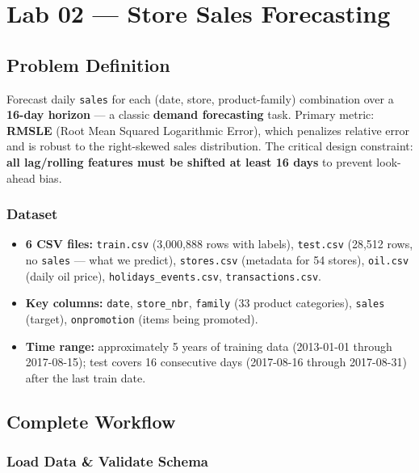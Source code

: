 \chapter{Lab 02 — Store Sales Forecasting}
\label{ch:lab02}

\section{Problem Definition}

\begin{problembox}
Forecast daily \texttt{sales} for each (date, store, product-family) combination over a \textbf{16-day horizon} — a classic \textbf{demand forecasting} task. Primary metric: \textbf{RMSLE} (Root Mean Squared Logarithmic Error), which penalizes relative error and is robust to the right-skewed sales distribution. The critical design constraint: \textbf{all lag/rolling features must be shifted at least 16 days} to prevent look-ahead bias.
\end{problembox}

\subsection{Dataset}
\begin{itemize}
  \item \textbf{6 CSV files:} \texttt{train.csv} (3,000,888 rows with labels), \texttt{test.csv} (28,512 rows, no \texttt{sales} — what we predict), \texttt{stores.csv} (metadata for 54 stores), \texttt{oil.csv} (daily oil price), \texttt{holidays\_events.csv}, \texttt{transactions.csv}.
  \item \textbf{Key columns:} \texttt{date}, \texttt{store\_nbr}, \texttt{family} (33 product categories), \texttt{sales} (target), \texttt{onpromotion} (items being promoted).
  \item \textbf{Time range:} approximately 5 years of training data (2013-01-01 through 2017-08-15); test covers 16 consecutive days (2017-08-16 through 2017-08-31) after the last train date.
\end{itemize}

\section{Complete Workflow}

\subsection{Load Data \& Validate Schema}

